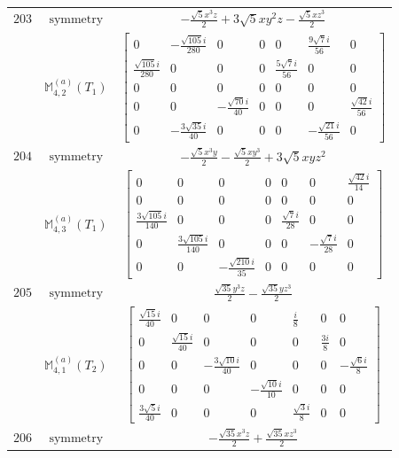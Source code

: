 \documentclass[fleqn,8pt,landscape]{jsarticle}
\begin{document}
\begin{longtable}{ccc}
$ 203 $ & $ \text{symmetry} $ & $ - \frac{\sqrt{5} x^{3} z}{2} + 3 \sqrt{5} x y^{2} z - \frac{\sqrt{5} x z^{3}}{2} $ \\
$  $ & $ \mathbb{M}_{4,2}^{(a)}(T_{1}) $ & $ \begin{bmatrix} 0 & - \frac{\sqrt{105} i}{280} & 0 & 0 & 0 & \frac{9 \sqrt{7} i}{56} & 0 \\ \frac{\sqrt{105} i}{280} & 0 & 0 & 0 & \frac{5 \sqrt{7} i}{56} & 0 & 0 \\ 0 & 0 & 0 & 0 & 0 & 0 & 0 \\ 0 & 0 & - \frac{\sqrt{70} i}{40} & 0 & 0 & 0 & \frac{\sqrt{42} i}{56} \\ 0 & - \frac{3 \sqrt{35} i}{40} & 0 & 0 & 0 & - \frac{\sqrt{21} i}{56} & 0 \end{bmatrix} $ \\ \hline
$ 204 $ & $ \text{symmetry} $ & $ - \frac{\sqrt{5} x^{3} y}{2} - \frac{\sqrt{5} x y^{3}}{2} + 3 \sqrt{5} x y z^{2} $ \\
$  $ & $ \mathbb{M}_{4,3}^{(a)}(T_{1}) $ & $ \begin{bmatrix} 0 & 0 & 0 & 0 & 0 & 0 & \frac{\sqrt{42} i}{14} \\ 0 & 0 & 0 & 0 & 0 & 0 & 0 \\ \frac{3 \sqrt{105} i}{140} & 0 & 0 & 0 & \frac{\sqrt{7} i}{28} & 0 & 0 \\ 0 & \frac{3 \sqrt{105} i}{140} & 0 & 0 & 0 & - \frac{\sqrt{7} i}{28} & 0 \\ 0 & 0 & - \frac{\sqrt{210} i}{35} & 0 & 0 & 0 & 0 \end{bmatrix} $ \\ \hline
$ 205 $ & $ \text{symmetry} $ & $ \frac{\sqrt{35} y^{3} z}{2} - \frac{\sqrt{35} y z^{3}}{2} $ \\
$  $ & $ \mathbb{M}_{4,1}^{(a)}(T_{2}) $ & $ \begin{bmatrix} \frac{\sqrt{15} i}{40} & 0 & 0 & 0 & \frac{i}{8} & 0 & 0 \\ 0 & \frac{\sqrt{15} i}{40} & 0 & 0 & 0 & \frac{3 i}{8} & 0 \\ 0 & 0 & - \frac{3 \sqrt{10} i}{40} & 0 & 0 & 0 & - \frac{\sqrt{6} i}{8} \\ 0 & 0 & 0 & - \frac{\sqrt{10} i}{10} & 0 & 0 & 0 \\ \frac{3 \sqrt{5} i}{40} & 0 & 0 & 0 & \frac{\sqrt{3} i}{8} & 0 & 0 \end{bmatrix} $ \\ \hline
$ 206 $ & $ \text{symmetry} $ & $ - \frac{\sqrt{35} x^{3} z}{2} + \frac{\sqrt{35} x z^{3}}{2} $ \\

\end{longtable}
\end{document}

